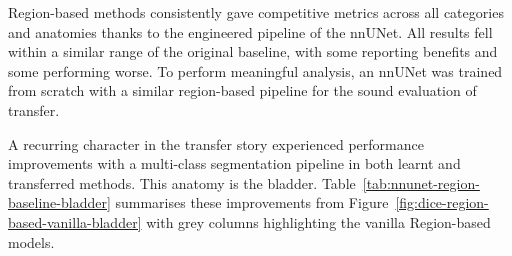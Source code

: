 \documentclass[11pt,twoside]{report}
\begin{document}

Region-based methods consistently gave competitive metrics across all categories and anatomies thanks to the engineered pipeline of the nnUNet. All results fell within a similar range of the original baseline, with some reporting benefits and some performing worse. To perform meaningful analysis, an nnUNet was trained from scratch with a similar region-based pipeline for the sound evaluation of transfer.

A recurring character in the transfer story experienced performance improvements with a multi-class segmentation pipeline in both learnt and transferred methods. This anatomy is the bladder. Table~\ref{tab:nnunet-region-baseline-bladder} summarises these improvements from Figure~\ref{fig:dice-region-based-vanilla-bladder} with grey columns highlighting the vanilla Region-based models.
\end{document}

